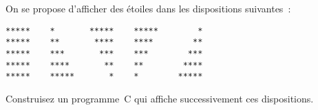 \begin{exercice}
  On se propose d'afficher des \'etoiles dans les dispositions suivantes~:
\begin{verbatim}
*****    *       *****    *****        *    
*****    **       ****    ****        **    
*****    ***       ***    ***        ***    
*****    ****       **    **        ****    
*****    *****       *    *        *****    
\end{verbatim}
  Construisez un programme~C qui affiche successivement ces dispositions.
  \ifcorrection
  \begin{correction}
    
  \end{correction}
  \fi
\end{exercice}
